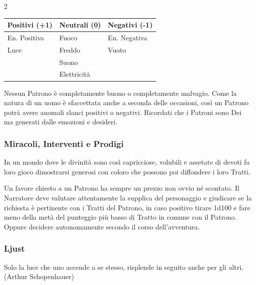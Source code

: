 \begin{multicols}{2}
\noindent\begin{tabularx}{\linewidth}{lXX}
	\toprule
\rowcolor{gray!20}\textbf{Positivi} (+1) & \textbf{Neutrali} (0) & \textbf{Negativi} (-1)\\
\toprule
En. Positiva& Fuoco& En. Negativa\\
\rowcolor{gray!20}Luce & Freddo& Vuoto\\
& Suono & \\
\rowcolor{gray!20}& Elettricità &
\end{tabularx}

\medskip

Nessun Patrono è completamente buono o completamente malvagio. Come la natura di un uomo è sfaccettata anche a seconda delle occasioni, così un Patrono potrà avere anomali slanci positivi o negativi. Ricordati che i Patroni sono Dei ma generati dalle emozioni e desideri.

\subsubsection{Miracoli, Interventi e Prodigi}

In un mondo dove le divinità sono così capricciose, volubili e assetate di devoti fa loro gioco dimostrarsi generosi con coloro che possono poi diffondere i loro Tratti.

Un favore chiesto a un Patrono ha sempre un prezzo non ovvio né scontato. Il Narratore deve valutare attentamente la supplica del personaggio e giudicare se la richiesta è pertinente con i Tratti del Patrono, in caso positivo tirare 1d100 e fare meno della metà del punteggio più basso di Tratto in comune con il Patrono. Oppure decidere autonomamente secondo il corso dell'avventura.



\subsubsection{Ljust}\label{ljust}\hypertarget{ljust}{}


\begin{enfasi}{
Solo la luce che uno accende a se stesso, risplende in seguito anche per gli altri. (Arthur Schopenhauer)
}\end{enfasi}



\end{multicols}
